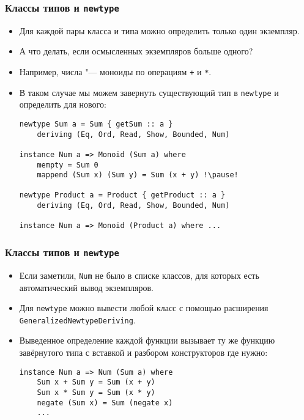 \documentclass[10pt]{beamer}
\begin{document}
\begin{frame}[fragile]
  \frametitle{Классы типов и \lstinline|newtype|}
  \begin{itemize}
    \item Для каждой пары класса и типа можно определить только один экземпляр.
    \item А что делать, если осмысленных экземпляров больше одного?
    \item Например, числа "--- моноиды по операциям \lstinline|+| и \lstinline|*|.\pause
    \item В таком случае мы можем завернуть существующий тип в \lstinline|newtype| и определить для нового:
          \begin{lstlisting}[basicstyle=\ttfamily\footnotesize]
newtype Sum a = Sum { getSum :: a }
    deriving (Eq, Ord, Read, Show, Bounded, Num)

instance Num a => Monoid (Sum a) where
    mempty = Sum 0
    mappend (Sum x) (Sum y) = Sum (x + y) !\pause!

newtype Product a = Product { getProduct :: a }
    deriving (Eq, Ord, Read, Show, Bounded, Num)

instance Num a => Monoid (Product a) where ...
\end{lstlisting}
  \end{itemize}
\end{frame}

\begin{frame}[fragile]
  \frametitle{Классы типов и \lstinline|newtype|}
  \begin{itemize}
    \item Если заметили, \lstinline|Num| не было в списке классов, для которых есть автоматический вывод экземпляров.
    \item Для \lstinline|newtype| можно вывести любой класс с помощью расширения \lstinline|GeneralizedNewtypeDeriving|.\pause
    \item Выведенное определение каждой функции вызывает ту же функцию завёрнутого типа с вставкой и разбором конструкторов где нужно:
          \begin{lstlisting}
instance Num a => Num (Sum a) where
    Sum x + Sum y = Sum (x + y)
    Sum x * Sum y = Sum (x * y)
    negate (Sum x) = Sum (negate x)
    ...
\end{lstlisting}
  \end{itemize}
\end{frame}
\end{document}
